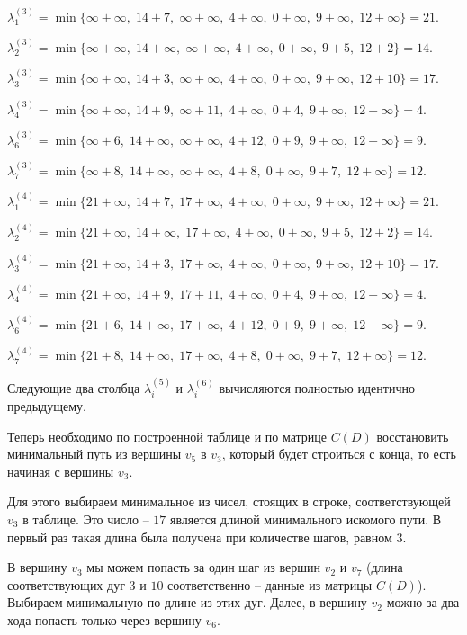 \documentclass[fleqn]{article}
\begin{document}
\medskip

$\lambda_1^{(3)} =\min\{\infty+\infty,\; 14+7,\; \infty+\infty,\; 4+\infty,\; 0+\infty,\; 9+\infty,\; 12+\infty\}=21.$

$\lambda_2^{(3)} =\min\{\infty+\infty,\; 14+\infty,\; \infty+\infty,\; 4+\infty,\; 0+\infty,\; 9+5,\; 12+2\}=14.$

$\lambda_3^{(3)} =\min\{\infty+\infty,\; 14+3,\; \infty+\infty,\; 4+\infty,\; 0+\infty,\; 9+\infty,\; 12+10\}=17.$

$\lambda_4^{(3)} =\min\{\infty+\infty,\; 14+9,\; \infty+11,\; 4+\infty,\; 0+4,\; 9+\infty,\; 12+\infty\}=4.$

$\lambda_6^{(3)} =\min\{\infty+6,\; 14+\infty,\; \infty+\infty,\; 4+12,\; 0+9,\; 9+\infty,\; 12+\infty\}=9.$

$\lambda_7^{(3)} =\min\{\infty+8,\; 14+\infty,\; \infty+\infty,\; 4+8,\; 0+\infty,\; 9+7,\; 12+\infty\}=12.$

\medskip

$\lambda_1^{(4)} =\min\{21+\infty,\; 14+7,\; 17+\infty,\; 4+\infty,\; 0+\infty,\; 9+\infty,\; 12+\infty\}=21.$

$\lambda_2^{(4)} =\min\{21+\infty,\; 14+\infty,\; 17+\infty,\; 4+\infty,\; 0+\infty,\; 9+5,\; 12+2\}=14.$

$\lambda_3^{(4)} =\min\{21+\infty,\; 14+3,\; 17+\infty,\; 4+\infty,\; 0+\infty,\; 9+\infty,\; 12+10\}=17.$

$\lambda_4^{(4)} =\min\{21+\infty,\; 14+9,\; 17+11,\; 4+\infty,\; 0+4,\; 9+\infty,\; 12+\infty\}=4.$

$\lambda_6^{(4)} =\min\{21+6,\; 14+\infty,\; 17+\infty,\; 4+12,\; 0+9,\; 9+\infty,\; 12+\infty\}=9.$

$\lambda_7^{(4)} =\min\{21+8,\; 14+\infty,\; 17+\infty,\; 4+8,\; 0+\infty,\; 9+7,\; 12+\infty\}=12.$

\medskip

Следующие два столбца $\lambda_i^{(5)}$ и $\lambda_i^{(6)}$ вычисляются полностью идентично предыдущему.

Теперь необходимо по построенной таблице и по матрице $C(D)$ восстановить минимальный путь из вершины $v_5$ в $v_3$, который будет строиться с конца, то есть начиная с вершины $v_3$.

Для этого выбираем минимальное из чисел, стоящих в строке, соответствующей $v_3$ в таблице. Это число – $17$ является длиной минимального искомого пути. В первый раз такая длина была получена при количестве шагов, равном $3$.

В вершину $v_3$ мы можем попасть за один шаг из вершин $v_2$ и $v_7$ (длина соответствующих дуг $3$ и $10$ соответственно – данные из матрицы $C(D)$). Выбираем минимальную по длине из этих дуг. Далее, в вершину $v_2$ можно за два хода попасть только через вершину $v_6$.
\end{document}
